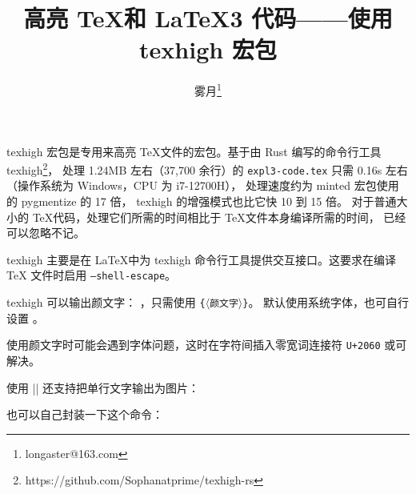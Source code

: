 \documentclass[zihao=-4,fontset=fandol]{ctexart}
\begin{document}
\title{高亮 \TeX 和 \LaTeX3 代码——使用\textsf{texhigh} 宏包}
\author{雾月\thanks{longaster@163.com}}
\maketitle

\textsf{texhigh} 宏包是专用来高亮 \TeX 文件的宏包。基于由 Rust 编写的命令行工具
texhigh\footnote{https://github.com/Sophanatprime/texhigh-rs}，
处理 1.24MB 左右（37,700 余行）的 \texttt{expl3-code.tex} 只需 0.16s 左右
（操作系统为 Windows，CPU 为 i7-12700H），
处理速度约为 \textsf{minted} 宏包使用的 pygmentize 的 17 倍，
texhigh 的增强模式也比它快 10 到 15 倍。
对于普通大小的 \TeX 代码，处理它们所需的时间相比于 \TeX 文件本身编译所需的时间，
已经可以忽略不记。

\textsf{texhigh} 主要是在 \LaTeX 中为 texhigh 命令行工具提供交互接口。这要求在编译 \TeX
文件时启用 \texttt{--shell-escape}。

\textsf{texhigh} 可以输出颜文字：
 ，只需使用 \texhighverb{\kaomoji}\texttt\{\ensuremath{\langle}\verb|颜文字|\ensuremath{\rangle}\texttt\}。
默认使用系统字体，也可自行设置 。

\quad
{}\quad
{}\quad
{}\quad
{}

使用颜文字时可能会遇到字体问题，这时在字符间插入零宽词连接符 \texttt{U+2060} 或可解决。

使用 \texhighverb|\kaomoji*| 还支持把单行文字输出为图片：
\begin{examcode}[texhigh options={
  char-category={emoji}{[\p{Emoji}--\p{ASCII}]}{\mbox{\emojifont #1}} %
}]{}

\end{examcode}

也可以自己封装一下这个命令：
\end{document}
